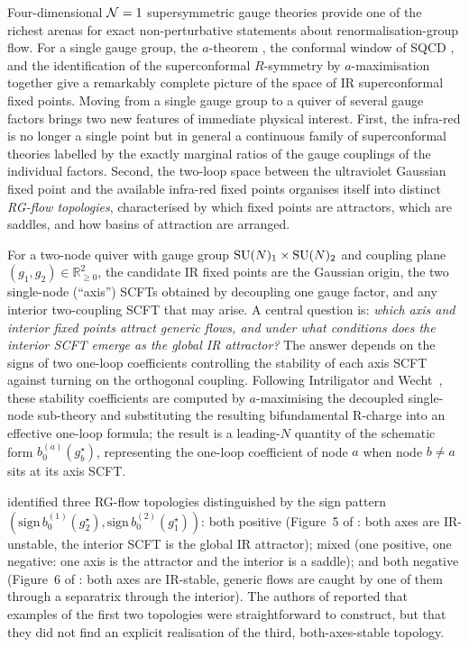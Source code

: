 
Four-dimensional $\mathcal{N}=1$ supersymmetric gauge theories provide one of
the richest arenas for exact non-perturbative statements about
renormalisation-group flow.  For a single gauge group, the $a$-theorem
\cite{KomargodskiSchwimmer}, the conformal window of SQCD
\cite{Seiberg1994}, and the identification of the superconformal
$R$-symmetry by $a$-maximisation \cite{IntriligatorWecht2003} together
give a remarkably complete picture of the space of IR superconformal
fixed points.  Moving from a single gauge group to a quiver of several
gauge factors brings two new features of immediate physical interest.
First, the infra-red is no longer a single point but in general a
continuous family of superconformal theories labelled by the exactly
marginal ratios of the gauge couplings of the individual factors.
Second, the two-loop space between the ultraviolet Gaussian fixed
point and the available infra-red fixed points organises itself into
distinct \emph{RG-flow topologies}, characterised by which fixed
points are attractors, which are saddles, and how basins of attraction
are arranged.

For a two-node quiver with gauge group
$\mathrm{SU}(N)_{1}\times\mathrm{SU}(N)_{2}$ and coupling plane
$(g_{1},g_{2})\in\mathbb R_{\ge 0}^{2}$, the candidate IR fixed points
are the Gaussian origin, the two single-node (``axis'') SCFTs obtained
by decoupling one gauge factor, and any interior two-coupling SCFT
that may arise.  A central question is:
\emph{which axis and interior fixed points attract generic flows,
and under what conditions does the interior SCFT emerge as the
global IR attractor?}
The answer depends on the signs of two one-loop coefficients
controlling the stability of each axis SCFT against turning on the
orthogonal coupling.  Following Intriligator and
Wecht~\cite{IW2005}, these stability coefficients are computed by
$a$-maximising the decoupled single-node sub-theory and substituting
the resulting bifundamental R-charge into an effective one-loop
formula; the result is a leading-$N$ quantity of the schematic form
$b_{0}^{(a)}(g_{b}^{\star})$, representing the one-loop coefficient
of node $a$ when node $b\ne a$ sits at its axis SCFT.

\cite{IW2005} identified three RG-flow topologies distinguished by
the sign pattern $(\text{sign}\,b_{0}^{(1)}(g_{2}^{\star}),
\text{sign}\,b_{0}^{(2)}(g_{1}^{\star}))$: both positive (Figure~5 of
\cite{IW2005}: both axes are IR-unstable, the interior SCFT is the
global IR attractor); mixed (one positive, one negative: one axis is
the attractor and the interior is a saddle); and both negative
(Figure~6 of \cite{IW2005}: both axes are IR-stable, generic flows
are caught by one of them through a separatrix through the interior).
The authors of \cite{IW2005} reported that examples of the first two
topologies were straightforward to construct, but that they did not
find an explicit realisation of the third, both-axes-stable topology.

